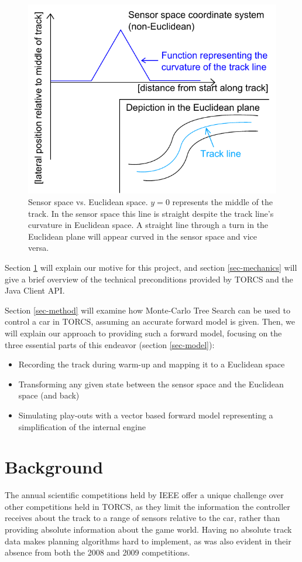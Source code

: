 \documentclass[conference]{IEEEtran}
\begin{document}
\begin{figure}
\includegraphics[width=\columnwidth]{euclidean.pdf}
\caption{Sensor space vs. Euclidean space. $y=0$ represents the middle of the track. In the sensor space this line is straight despite the track line's curvature in Euclidean space. A straight line through a turn in the Euclidean plane will appear curved in the sensor space and vice versa.}
\label{fig-euclidean}
\end{figure}

Section \ref{sec-background} will explain our motive for this project, and section \ref{sec-mechanics} will give a brief overview of the technical preconditions provided by TORCS and the Java Client API.

Section \ref{sec-method} will examine how Monte-Carlo Tree Search can be used to control a car in TORCS, assuming an accurate forward model is given. Then, we will explain our approach to providing such a forward model, focusing on the three essential parts of this endeavor (section \ref{sec-model}):
\begin{itemize}
\item Recording the track during warm-up and mapping it to a Euclidean space
\item Transforming any given state between the sensor space and the Euclidean space (and back)
\item Simulating play-outs with a vector based forward model representing a simplification of the internal engine
\end{itemize}

\section {Background}
\label{sec-background}
The annual scientific competitions \cite{2008championship}\cite{2009championship} held by IEEE offer a unique challenge over other competitions held in TORCS, as they limit the information the controller receives about the track to a range of sensors relative to the car, rather than providing absolute information about the game world. Having no absolute track data makes planning algorithms hard to implement, as was also evident in their absence from both the 2008 \cite{2008championship} and 2009 \cite{2009championship} competitions.
\end{document}
